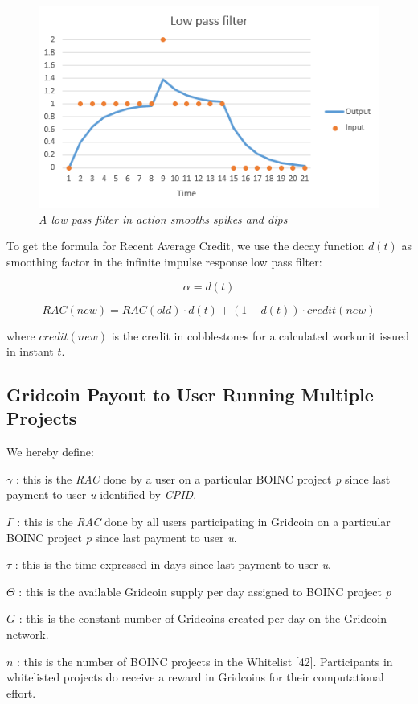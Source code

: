 \begin{figure}
\centering
\includegraphics{figures/low-pass}
\caption{\textit{A low pass filter in action smooths spikes and dips}}
\small
\end{figure}


To get the formula for Recent Average Credit, we use the decay function $d(t)$ as smoothing factor in the infinite impulse response low pass filter:

\begin{equation}
\alpha=d(t)
\end{equation}

\begin{equation}
RAC(new) = RAC(old) \cdot d(t) + (1-d(t)) \cdot credit(new)
\end{equation}

where $credit(new)$ is the credit in cobblestones for a calculated workunit issued in instant $t$.

\subsection{Gridcoin Payout to User Running Multiple Projects}

We hereby define:
\begin{description}
  \item{$\gamma$} : this is the \textit{RAC} done by a user on a particular BOINC project \textit{p} since last payment to user \textit{u} identified by \textit{CPID}.
  \item{$\Gamma$} : this is the \textit{RAC} done by all users participating in Gridcoin on a particular BOINC project \textit{p} since last payment to user \textit{u}.
  \item{$\tau$} : this is the time expressed in days since last payment to user \textit{u}.
  \item{$\Theta$} : this is the available Gridcoin supply per day assigned to BOINC project \textit{p}
  \item{$G$} : this is the constant number of Gridcoins created per day on the Gridcoin network. 
  \item{$n$} : this is the number of BOINC projects in the Whitelist [42]. Participants in whitelisted projects do receive a reward in Gridcoins for their computational effort.  
\end{description}

